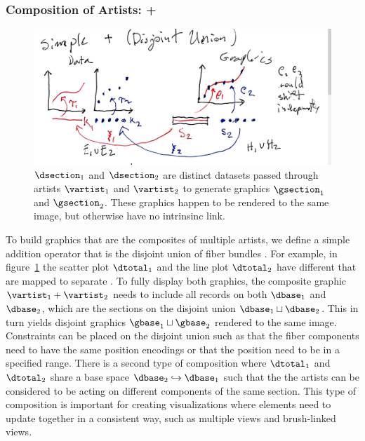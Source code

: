 \documentclass[../main.tex]{subfiles}
\begin{document}
\subsubsection{Composition of Artists: +}
\begin{figure}
    \includegraphics[width=1\textwidth]{figures/math/addition_operator.png}
    \caption{$\dsection_1$ and $\dsection_2$ are distinct datasets passed through artists $\vartist_1$ and $\vartist_2$ to generate graphics $\gsection_1$ and $\gsection_2$. These graphics happen to be rendered to the same image, but otherwise have no intrinsinc link.}
    \label{fig:artist_plus}
\end{figure}
To build graphics that are the composites of multiple artists, we define a simple addition operator that is the disjoint union of fiber bundles \dtotal.  For example, in figure~\ref{fig:artist_plus} the scatter plot $\dtotal_1$ and the line plot $\dtotal_2$ have different \dbase that are mapped to separate \gbase. To fully display both graphics, the composite graphic $\vartist_1 + \vartist_2$ needs to include all records on both $\dbase_1$ and $\dbase_2$, which are the sections on the disjoint union $\dbase_1 \sqcup \dbase_2$. This in turn yields disjoint graphics $\gbase_1 \sqcup \gbase_2$ rendered to the same image. Constraints can be placed on the disjoint union such as that the fiber components need to have the same \vchannel position encodings or that the position \vsection need to be in a specified range. There is a second type of composition where $\dtotal_1$ and $\dtotal_2$ share a base space $\dbase_2 \hookrightarrow \dbase_1$ such that the the artists can be considered to be acting on different components of the same section. This type of composition is important for creating visualizations where elements need to update together in a consistent way, such as multiple views \cite{alboRadarComparativeEvaluation2016a, hullmanKeeping2018} and brush-linked views\cite{beckerBrushingScatterplots1987,bujaInteractiveData1991}. 
\end{document}
